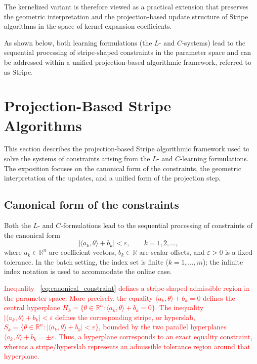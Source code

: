 \documentclass[a4paper,fleqn]{cas-sc}
\begin{document}
The kernelized variant is therefore viewed as a practical extension that preserves the geometric interpretation and the projection-based update structure of Stripe algorithms in the space of kernel expansion coefficients.

As shown below, both learning formulations (the $L$- and $C$-systems)
lead to the sequential processing of stripe-shaped constraints
in the parameter space and can be addressed
within a unified projection-based algorithmic framework, referred to as Stripe.


\section{Projection-Based Stripe Algorithms}
\label{sec:stripe_algorithms}

This section describes the projection-based Stripe algorithmic framework
used to solve the systems of constraints arising from the $L$- and $C$-learning formulations.
The exposition focuses on the canonical form of the constraints,
the geometric interpretation of the updates,
and a unified form of the projection step.


\subsection{Canonical form of the constraints}

Both the $L$- and $C$-formulations lead to the sequential processing
of constraints of the canonical form
\begin{equation}
\label{eq:canonical_constraint}
\bigl| \langle a_k, \theta \rangle + b_k \bigr| < \varepsilon,
\qquad k = 1, 2, \ldots,
\end{equation}
where $a_k \in \mathbb{R}^n$ are coefficient vectors,
$b_k \in \mathbb{R}$ are scalar offsets,
and $\varepsilon > 0$ is a fixed tolerance.
In the batch setting, the index set is finite ($k = 1, \dots, m$);
the infinite index notation is used to accommodate the online case.

\textcolor{red}{ Inequality ~\eqref{eq:canonical_constraint} defines a stripe-shaped admissible region in the parameter space. More precisely, the equality $\langle a_k,\theta\rangle+b_k=0$ defines the central hyperplane $H_k=\{\theta\in\mathbb{R}^n:\langle a_k,\theta\rangle+b_k=0\}$. The inequality $|\langle a_k,\theta\rangle+b_k|<\varepsilon$ defines the corresponding stripe, or hyperslab, $S_k=\{\theta\in\mathbb{R}^n:|\langle a_k,\theta\rangle+b_k|<\varepsilon\}$, bounded by the two parallel hyperplanes $\langle a_k,\theta\rangle+b_k=\pm\varepsilon$. Thus, a hyperplane corresponds to an exact equality constraint, whereas a stripe/hyperslab represents an admissible tolerance region around that hyperplane.}
\end{document}

